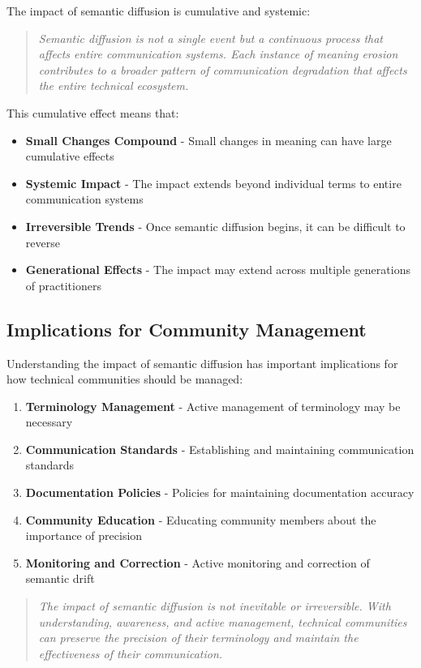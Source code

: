 \documentclass[11pt]{article}
\begin{document}
The impact of semantic diffusion is cumulative and systemic:

\begin{quote}
\emph{Semantic diffusion is not a single event but a continuous process that affects entire communication systems. Each instance of meaning erosion contributes to a broader pattern of communication degradation that affects the entire technical ecosystem.}
\end{quote}

This cumulative effect means that:

\begin{itemize}
\item \textbf{Small Changes Compound} - Small changes in meaning can have large cumulative effects
\item \textbf{Systemic Impact} - The impact extends beyond individual terms to entire communication systems
\item \textbf{Irreversible Trends} - Once semantic diffusion begins, it can be difficult to reverse
\item \textbf{Generational Effects} - The impact may extend across multiple generations of practitioners
\end{itemize}

\subsection{Implications for Community Management}

Understanding the impact of semantic diffusion has important implications for how technical communities should be managed:

\begin{enumerate}
\item \textbf{Terminology Management} - Active management of terminology may be necessary
\item \textbf{Communication Standards} - Establishing and maintaining communication standards
\item \textbf{Documentation Policies} - Policies for maintaining documentation accuracy
\item \textbf{Community Education} - Educating community members about the importance of precision
\item \textbf{Monitoring and Correction} - Active monitoring and correction of semantic drift
\end{enumerate}

\begin{quote}
\emph{The impact of semantic diffusion is not inevitable or irreversible. With understanding, awareness, and active management, technical communities can preserve the precision of their terminology and maintain the effectiveness of their communication.}
\end{quote}
\end{document}
